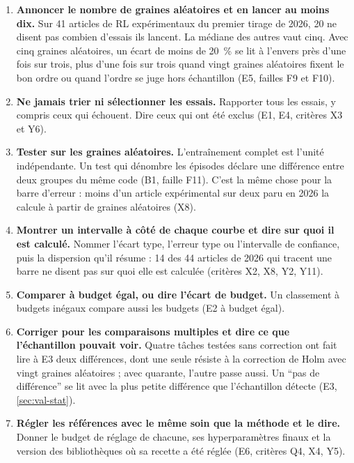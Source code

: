 \begin{enumerate}
  \item \textbf{Annoncer le nombre de graines aléatoires et en lancer au moins dix.} Sur 41 articles
        de RL expérimentaux du premier tirage de 2026, 20 ne disent pas combien d'essais ils
        lancent. La médiane des autres vaut cinq. Avec cinq graines aléatoires, un écart de moins de
        20~\% se lit à l'envers près d'une fois sur trois, plus d'une fois sur trois quand vingt
        graines aléatoires fixent le bon ordre ou quand l'ordre se juge hors échantillon (E5,
        failles F9 et F10).
  \item \textbf{Ne jamais trier ni sélectionner les essais.} Rapporter tous les essais, y compris
        ceux qui échouent. Dire ceux qui ont été exclus (E1, E4, critères X3 et Y6).
  \item \textbf{Tester sur les graines aléatoires.} L'entraînement complet est l'unité indépendante. Un
        test qui dénombre les épisodes déclare une différence entre deux groupes du même code (B1, faille
        F11). C'est la même chose pour la barre d'erreur : moins d'un article expérimental sur deux paru
        en 2026 la calcule à partir de graines aléatoires (X8).
  \item \textbf{Montrer un intervalle à côté de chaque courbe et dire sur quoi il est calculé.}
        Nommer l'écart type, l'erreur type ou l'intervalle de confiance, puis la dispersion qu'il
        résume : 14 des 44 articles de 2026 qui tracent une barre ne disent pas sur quoi elle est
        calculée (critères X2, X8, Y2, Y11).
  \item \textbf{Comparer à budget égal, ou dire l'écart de budget.} Un classement à budgets
        inégaux compare aussi les budgets (E2 à budget égal).
  \item \textbf{Corriger pour les comparaisons multiples et dire ce que l'échantillon pouvait
        voir.} Quatre tâches testées sans correction ont fait lire à E3 deux différences, dont une
        seule résiste à la correction de Holm avec vingt graines aléatoires ; avec quarante, l'autre
        passe aussi. Un \enquote{pas de différence} se lit avec la plus
        petite différence que l'échantillon détecte (E3, \cref{sec:val-stat}).
  \item \textbf{Régler les références avec le même soin que la méthode et le dire.} Donner le
        budget de réglage de chacune, ses hyperparamètres finaux et la version des bibliothèques où
        sa recette a été réglée (E6, critères Q4, X4, Y5).

\end{enumerate}
